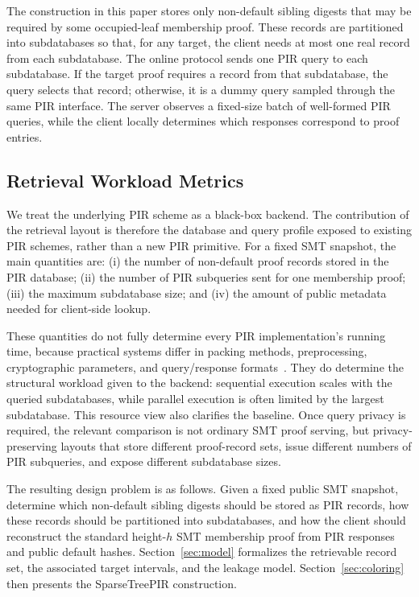 The construction in this paper stores only non-default sibling digests that may be required by some occupied-leaf membership proof. These records are partitioned into subdatabases so that, for any target, the client needs at most one real record from each subdatabase. The online protocol sends one PIR query to each subdatabase. If the target proof requires a record from that subdatabase, the query selects that record; otherwise, it is a dummy query sampled through the same PIR interface. The server observes a fixed-size batch of well-formed PIR queries, while the client locally determines which responses correspond to proof entries.

\subsection{Retrieval Workload Metrics}

We treat the underlying PIR scheme as a black-box backend. The contribution of the retrieval layout is therefore the database and query profile exposed to existing PIR schemes, rather than a new PIR primitive. For a fixed SMT snapshot, the main quantities are: (i) the number of non-default proof records stored in the PIR database; (ii) the number of PIR subqueries sent for one membership proof; (iii) the maximum subdatabase size; and (iv) the amount of public metadata needed for client-side lookup.

These quantities do not fully determine every PIR implementation's running time, because practical systems differ in packing methods, preprocessing, cryptographic parameters, and query/response formats~\cite{chor,ko97,xpir,sealpir,spiral,simplepir}. They do determine the structural workload given to the backend: sequential execution scales with the queried subdatabases, while parallel execution is often limited by the largest subdatabase. This resource view also clarifies the baseline. Once query privacy is required, the relevant comparison is not ordinary SMT proof serving, but privacy-preserving layouts that store different proof-record sets, issue different numbers of PIR subqueries, and expose different subdatabase sizes.

The resulting design problem is as follows. Given a fixed public SMT snapshot, determine which non-default sibling digests should be stored as PIR records, how these records should be partitioned into subdatabases, and how the client should reconstruct the standard height-$h$ SMT membership proof from PIR responses and public default hashes. Section~\ref{sec:model} formalizes the retrievable record set, the associated target intervals, and the leakage model. Section~\ref{sec:coloring} then presents the SparseTreePIR construction.


